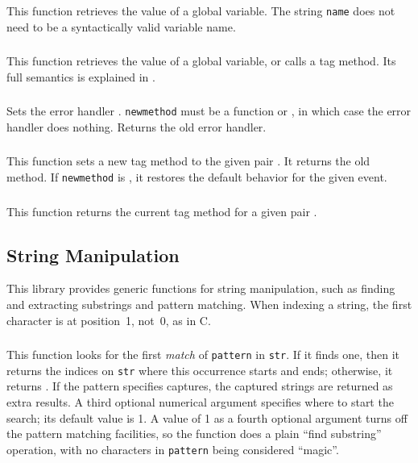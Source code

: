 \subsubsection*{\ff {}}
This function retrieves the value of a global variable.
The string \verb|name| does not need to be a
syntactically valid variable name.

\subsubsection*{\ff {}}
This function retrieves the value of a global variable,
or calls a tag method.
Its full semantics is explained in .

\subsubsection*{\ff {}}
\label{pdf-seterrormethod}
Sets the error handler .
\verb|newmethod| must be a function or \nil,
in which case the error handler does nothing.
Returns the old error handler.

\subsubsection*{\ff {}}
This function sets a new tag method to the given pair .
It returns the old method.
If \verb|newmethod| is \nil,
it restores the default behavior for the given event.

\subsubsection*{\ff {}}
This function returns the current tag method
for a given pair .


\subsection{String Manipulation}
This library provides generic functions for string manipulation,
such as finding and extracting substrings and pattern matching.
When indexing a string, the first character is at position~1,
not~0, as in C.

\subsubsection*{\ff {}}
This function looks for the first \emph{match} of
\verb|pattern| in \verb|str|.
If it finds one, then it returns the indices on \verb|str|
where this occurrence starts and ends;
otherwise, it returns \nil.
If the pattern specifies captures,
the captured strings are returned as extra results.
A third optional numerical argument specifies where to start the search;
its default value is 1.
A value of 1 as a fourth optional argument
turns off the pattern matching facilities,
so the function does a plain ``find substring'' operation,
with no characters in \verb|pattern| being considered ``magic''.

